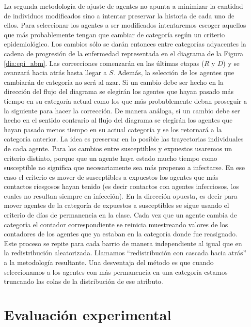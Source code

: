 La segunda metodología de ajuste de agentes no apunta a minimizar la cantidad de individuos modificados sino a intentar preservar la historia de cada uno de ellos. Para seleccionar los agentes a ser modificados intentaremos escoger aquellos que más probablemente tengan que cambiar de categoría según un criterio epidemiológico. Los cambios sólo se darán entonces entre categorías adyacentes la cadena de progresión de la enfermedad representada en el diagrama de la Figura \ref{dia:epi_abm}. Las correcciones comenzarán en las últimas etapas ($R$ y $D$) y se avanzará hacia atrás hasta llegar a $S$. Además, la selección de los agentes que cambiarán de categoría no será al azar. Si un cambio debe ser hecho en la dirección del flujo del diagrama se elegirán los agentes que hayan pasado más tiempo en su categoría actual como los que más probablemente deban proseguir a la siguiente para hacer la corrección. De manera análoga, si un cambio debe ser hecho en el sentido contrario al flujo del diagrama se elegirán los agentes que hayan pasado menos tiempo en su actual categoría y se los retornará a la categoría anterior. La idea es preservar en lo posible las trayectorias individuales de cada agente. Para los cambios entre susceptibles y expuestos usaremos un criterio distinto, porque que un agente haya estado mucho tiempo como susceptible no significa que necesariamente sea más propenso a infectarse. En ese caso el criterio es mover de susceptibles a expuestos los agentes que más contactos riesgosos hayan tenido (es decir contactos con agentes infecciosos, los cuales no resultan siempre en infección). En la dirección opuesta, es decir para mover agentes de la categoría de expuestos a susceptibles se sigue usando el criterio de días de permanencia en la clase. Cada vez que un agente cambia de categoría el contador correspondiente se reinicia muestreando valores de los contadores de los agentes que ya estaban en la categoría donde fue reasignado. Este proceso se repite para cada barrio de manera independiente al igual que en la redistribución aleatorizada. Llamamos ``redistribución con cascada hacia atrás'' a la metodología resultante. Una desventaja del método es que cuando seleccionamos a los agentes con más permanencia en una categoría estamos truncando las colas de la distribución de ese atributo.

\section{Evaluación experimental}

